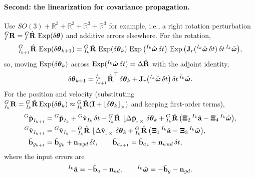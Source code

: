 \paragraph{Second: the linearization for covariance propagation.} Use $SO(3)+\mathbb{R}^{3}+\mathbb{R}^{3}+\mathbb{R}^{3}+\mathbb{R}^{3}$ for example, i.e., a right rotation perturbation ${}^{G}_{I}\boldsymbol{\mathbf{R}} = {}^{G}_{I}\hat{\boldsymbol{\mathbf{R}}}\,\operatorname{Exp}(\delta\boldsymbol{\mathbf{\theta}})$ and additive errors elsewhere. For the rotation,
\begin{align}
{}^{G}_{I_{k+1}}\hat{\boldsymbol{\mathbf{R}}}\,\operatorname{Exp}(\delta\boldsymbol{\mathbf{\theta}}_{k+1})
= {}^{G}_{I_k}\hat{\boldsymbol{\mathbf{R}}}\,\operatorname{Exp}(\delta\boldsymbol{\mathbf{\theta}}_k)\,\operatorname{Exp}\big({}^{I_k}\hat{\boldsymbol{\mathbf{\omega}}}\,\delta t\big)\,\operatorname{Exp}\big(\boldsymbol{\mathbf{J}}_r({}^{I_k}\hat{\boldsymbol{\mathbf{\omega}}}\,\delta t)\,\delta t\,{}^{I_k}\tilde{\boldsymbol{\mathbf{\omega}}}\big),
\end{align}
so, moving $\operatorname{Exp}(\delta\boldsymbol{\mathbf{\theta}}_k)$ across $\operatorname{Exp}({}^{I_k}\hat{\boldsymbol{\mathbf{\omega}}}\,\delta t) = \Delta\hat{\boldsymbol{\mathbf{R}}}$ with the adjoint identity,
\begin{align}
\delta\boldsymbol{\mathbf{\theta}}_{k+1} = {}^{I_k}_{I_{k+1}}\hat{\boldsymbol{\mathbf{R}}}^\top\,\delta\boldsymbol{\mathbf{\theta}}_k + \boldsymbol{\mathbf{J}}_r\big({}^{I_k}\hat{\boldsymbol{\mathbf{\omega}}}\,\delta t\big)\,\delta t\,{}^{I_k}\tilde{\boldsymbol{\mathbf{\omega}}}.
\end{align}
For the position and velocity (substituting ${}^{G}_{I_k}\boldsymbol{\mathbf{R}} = {}^{G}_{I_k}\hat{\boldsymbol{\mathbf{R}}}\operatorname{Exp}(\delta\boldsymbol{\mathbf{\theta}}_k) \approx {}^{G}_{I_k}\hat{\boldsymbol{\mathbf{R}}}(\boldsymbol{\mathbf{I}}+\left\lfloor\delta\boldsymbol{\mathbf{\theta}}_k\right\rfloor_{\times})$ and keeping first-order terms),
\begin{align}
{}^{G}\tilde{\boldsymbol{\mathbf{p}}}_{I_{k+1}} &= {}^{G}\tilde{\boldsymbol{\mathbf{p}}}_{I_k} + {}^{G}\tilde{\boldsymbol{\mathbf{v}}}_{I_k}\,\delta t - {}^{G}_{I_k}\hat{\boldsymbol{\mathbf{R}}}\,\left\lfloor\Delta\hat{\boldsymbol{\mathbf{p}}}\right\rfloor_{\times}\,\delta\boldsymbol{\mathbf{\theta}}_k + {}^{G}_{I_k}\hat{\boldsymbol{\mathbf{R}}}\,\big(\boldsymbol{\mathbf{\Xi}}_2\,{}^{I_k}\tilde{\boldsymbol{\mathbf{a}}} - \boldsymbol{\mathbf{\Xi}}_4\,{}^{I_k}\tilde{\boldsymbol{\mathbf{\omega}}}\big), \\
{}^{G}\tilde{\boldsymbol{\mathbf{v}}}_{I_{k+1}} &= {}^{G}\tilde{\boldsymbol{\mathbf{v}}}_{I_k} - {}^{G}_{I_k}\hat{\boldsymbol{\mathbf{R}}}\,\left\lfloor\Delta\hat{\boldsymbol{\mathbf{v}}}\right\rfloor_{\times}\,\delta\boldsymbol{\mathbf{\theta}}_k + {}^{G}_{I_k}\hat{\boldsymbol{\mathbf{R}}}\,\big(\boldsymbol{\mathbf{\Xi}}_1\,{}^{I_k}\tilde{\boldsymbol{\mathbf{a}}} - \boldsymbol{\mathbf{\Xi}}_3\,{}^{I_k}\tilde{\boldsymbol{\mathbf{\omega}}}\big), \\
\tilde{\boldsymbol{\mathbf{b}}}_{g_{k+1}} &= \tilde{\boldsymbol{\mathbf{b}}}_{g_k} + \boldsymbol{\mathbf{n}}_{wgd}\,\delta t, \qquad
\tilde{\boldsymbol{\mathbf{b}}}_{a_{k+1}} = \tilde{\boldsymbol{\mathbf{b}}}_{a_k} + \boldsymbol{\mathbf{n}}_{wad}\,\delta t,
\end{align}
where the input errors are
\begin{align}
{}^{I_k}\tilde{\boldsymbol{\mathbf{a}}} = -\tilde{\boldsymbol{\mathbf{b}}}_a - \boldsymbol{\mathbf{n}}_{ad}, \qquad
{}^{I_k}\tilde{\boldsymbol{\mathbf{\omega}}} = -\tilde{\boldsymbol{\mathbf{b}}}_g - \boldsymbol{\mathbf{n}}_{gd}.
\end{align}
